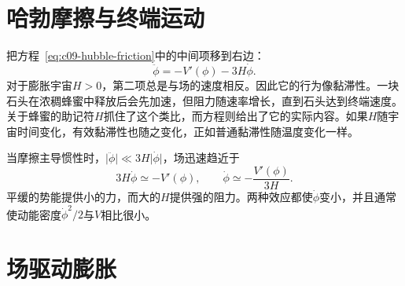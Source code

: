 \section{哈勃摩擦与终端运动}

把方程~\eqref{eq:c09-hubble-friction}中的中间项移到右边：
\begin{equation}
\ddot\phi=-V'(\phi)-3H\dot\phi.
\end{equation}
对于膨胀宇宙\(H>0\)，第二项总是与场的速度相反。因此它的行为像黏滞性。一块石头在浓稠蜂蜜中释放后会先加速，但阻力随速率增长，直到石头达到终端速度。关于蜂蜜的助记符\emph{\(H\)}抓住了这个类比，而方程则给出了它的实际内容。如果\(H\)随宇宙时间变化，有效黏滞性也随之变化，正如普通黏滞性随温度变化一样。

当摩擦主导惯性时，\(\lvert\ddot\phi\rvert\ll3H\lvert\dot\phi\rvert\)，场迅速趋近于
\begin{equation}
3H\dot\phi\simeq -V'(\phi),
\qquad
\dot\phi\simeq-\frac{V'(\phi)}{3H}.
\label{eq:c09-terminal}
\end{equation}
平缓的势能提供小的力，而大的\(H\)提供强的阻力。两种效应都使\(\dot\phi\)变小，并且通常使动能密度\(\dot\phi^2/2\)与\(V\)相比很小。

\begin{classroomqa}
\end{classroomqa}

\begin{classroomqa}
\end{classroomqa}

\section{场驱动膨胀}

